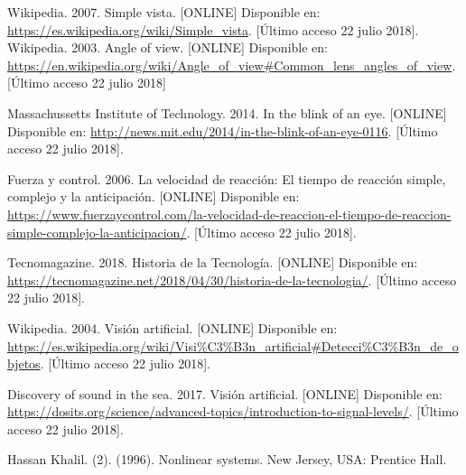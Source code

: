 \begin{thebibliography}{99}
 Wikipedia. 2007. Simple vista. [ONLINE] Disponible en: \url{https://es.wikipedia.org/wiki/Simple_vista}. [Último acceso 22 julio 2018].
 Wikipedia. 2003. Angle of view. [ONLINE] Disponible en: \url{https://en.wikipedia.org/wiki/Angle_of_view#Common_lens_angles_of_view}. [Último acceso 22 julio 2018]

 Massachussetts Institute of Technology. 2014. In the blink of an eye. [ONLINE] Disponible en: \url{http://news.mit.edu/2014/in-the-blink-of-an-eye-0116}. [Último acceso 22 julio 2018].

 Fuerza y control. 2006. La velocidad de reacción: El tiempo de reacción simple, complejo y la anticipación. [ONLINE] Disponible en: \url{https://www.fuerzaycontrol.com/la-velocidad-de-reaccion-el-tiempo-de-reaccion-simple-complejo-la-anticipacion/}. [Último acceso 22 julio 2018].

 Tecnomagazine. 2018. Historia de la Tecnología. [ONLINE] Disponible en: \url{https://tecnomagazine.net/2018/04/30/historia-de-la-tecnologia/}. [Último acceso 22 julio 2018].

 Wikipedia. 2004. Visión artificial. [ONLINE] Disponible en: \url{https://es.wikipedia.org/wiki/Visi%C3%B3n_artificial#Detecci%C3%B3n_de_objetos}. [Último acceso 22 julio 2018].


 Discovery of sound in the sea. 2017. Visión artificial. [ONLINE] Disponible en: \url{https://dosits.org/science/advanced-topics/introduction-to-signal-levels/}. [Último acceso 22 julio 2018].







 Hassan Khalil. (2). (1996). Nonlinear systems. New Jersey, USA: Prentice Hall. %
\end{thebibliography}